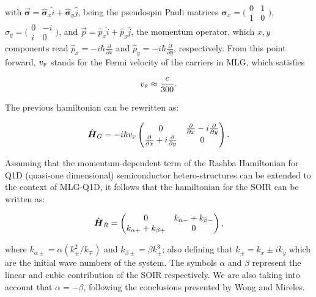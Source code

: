 \documentclass[twocolumn]{revtex4-2}
\newcommand{\bn}[1]{\mbox{\boldmath $#1$}}
\def\mb{\mbox}
\begin{document}
    \noindent with $\vec{\mathbf{\sigma}} = \hat{\mathbf{\sigma}}_{x}\hat{i} + \hat{\mathbf{\sigma}}_{y}\hat{j}$, being the pseudospin Pauli matrices $\hat{\mathbf{\sigma}}_{x} = \bigl(\begin{smallmatrix}0&1 \\ 1&0\end{smallmatrix} \bigr)$, $\hat{\sigma}_{y} = \bigl(\begin{smallmatrix}0&-i \\ i&0\end{smallmatrix} \bigr)$, and $\vec{p}=\hat{p}_{x}\hat{i}+\hat{p}_{y}\hat{j}$, the momentum operator, which $x, y$ components read $\hat{p}_{x} = -i\hbar\frac{\partial}{\partial x}$ and $\hat{p}_{y} = -i\hbar\frac{\partial}{\partial y}$, respectively.
    From this point forward, $v_{\mb{\tiny F}}$ stands for the Fermi velocity of the carriers in MLG, which satisfies

    \begin{equation}
        \label{eq:vF}
        v_{\mb{\tiny F}} \approx \frac{c}{300}.
    \end{equation}

    The previous hamiltonian can be rewritten as:

\begin{equation}
    \label{eq:pristineGrapheneMatrix}
    \hat{\bn{H}}_G = -i\hbar v_{\mb{\tiny F}}
    \begin{pmatrix}
        0 & \frac{\partial}{\partial x}- i\frac{\partial}{\partial y}\\
        \frac{\partial}{\partial x}+ i\frac{\partial}{\partial y} & 0
    \end{pmatrix}.
\end{equation}

    Assuming that the momentum-dependent term of the Rashba Hamiltonian for Q1D (quasi-one dimensional) semiconductor hetero-structures can be extended to the context of MLG-Q1D\cite{RDiago2010, JAP2019}, it follows that the hamiltonian for the SOIR can be written as:

    \begin{equation}
        \label{eq:SOIRHamiltonian}
        \hat{\bn{H}}_R =
        \begin{pmatrix}
            0 & k_{\alpha-} + k_{\beta-}\\
            k_{\alpha+} + k_{\beta+} & 0
        \end{pmatrix},
    \end{equation}

    \noindent where $k_{\alpha\pm} = \alpha\left(k_{\pm}^2/k_{\mp}\right)$ and $k_{\beta\pm} = \beta k_{\pm}^3$; also defining that $k_{\pm}=k_x\pm i k_y$ which are the initial wave numbers of the system.
    The symbols $\alpha$ and $\beta$ represent the linear and cubic contribution of the SOIR respectively.
    We are also taking into account that $\alpha = -\beta$, following the conclusions presented by Wong and Mireles\cite{WongUNAM2005}.
\end{document}
